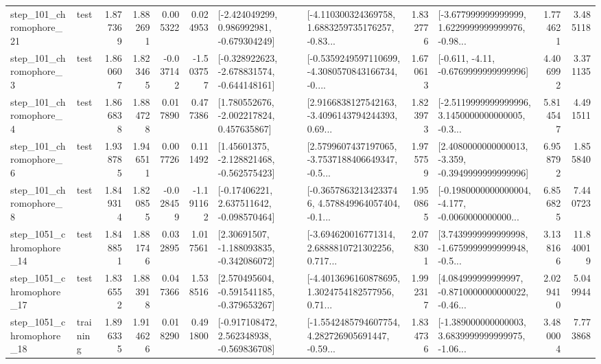 \begin{tabular}{llrrrrllrlrr}
  step\_101\_chromophore\_21 &      test &      1.877369 &    1.882691 &      0.005322 &  0.024953 &   [-2.424049299, 0.986992981, -0.679304249] &  [-4.110300324369758, 1.6883259735176257, -0.83... &       1.832776 &  [-3.677999999999999, 1.6229999999999976, -0.98... &            1.774621 &          3.485118 \\
   step\_101\_chromophore\_3 &      test &      1.860607 &    1.823465 &     -0.037142 & -1.503757 &  [-0.328922623, -2.678831574, -0.644148161] &  [-0.5359249597110699, -4.3080570843166734, -0.... &       1.670613 &               [-0.611, -4.11, -0.6769999999999996] &            4.406992 &          3.371135 \\
   step\_101\_chromophore\_4 &      test &      1.866838 &    1.884728 &      0.017890 &  0.477386 &    [1.780552676, -2.002217824, 0.457635867] &  [2.9166838127542163, -3.4096143794244393, 0.69... &       1.823973 &  [-2.5119999999999996, 3.1450000000000005, -0.3... &            5.814547 &          4.491511 \\
   step\_101\_chromophore\_6 &      test &      1.938785 &    1.946511 &      0.007726 &  0.111492 &    [1.45601375, -2.128821468, -0.562575423] &  [2.5799607437197065, -3.7537188406649347, -0.5... &       1.975759 &  [2.4080000000000013, -3.359, -0.3949999999999996] &            6.958792 &          1.855840 \\
   step\_101\_chromophore\_8 &      test &      1.849314 &    1.820855 &     -0.028459 & -1.191162 &    [-0.17406221, 2.637511642, -0.098570464] &  [-0.36578632134233746, 4.578849964057404, -0.1... &       1.950865 &  [-0.1980000000000004, -4.177, -0.0060000000000... &            6.856825 &          7.440723 \\
 step\_1051\_chromophore\_14 &      test &      1.848851 &    1.881746 &      0.032895 &  1.017561 &    [2.30691507, -1.188093835, -0.342086072] &  [-3.694620016771314, 2.6888810721302256, 0.717... &       2.078301 &  [3.7439999999999998, -1.6759999999999948, -0.5... &            3.138166 &         11.840019 \\
 step\_1051\_chromophore\_17 &      test &      1.836552 &    1.883918 &      0.047366 &  1.538516 &   [2.570495604, -0.591541185, -0.379653267] &  [-4.4013696160878695, 1.3024754182577956, 0.71... &       1.992317 &  [4.084999999999997, -0.8710000000000022, -0.46... &            2.029410 &          5.049944 \\
 step\_1051\_chromophore\_18 &  training &      1.896335 &    1.914626 &      0.018290 &  0.491800 &   [-0.917108472, 2.562348938, -0.569836708] &  [-1.5542485794607754, 4.282726905691447, -0.59... &       1.834736 &  [-1.389000000000003, 3.6839999999999975, -1.06... &            3.480004 &          7.773868 \\

\end{tabular}
